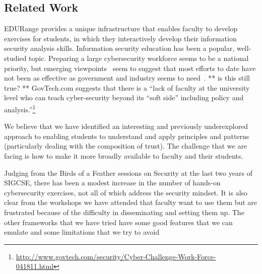 \subsection*{Related Work}
\label{ssec:related}

EDURange provides a unique infrastructure that enables faculty to develop exercises for students, in which they
interactively develop their information security analysis skills.
Information security education has been a popular, well-studied topic.
Preparing a large cybersecurity workforce seems to be a national
priority, but emerging viewpoints~\cite{cooper2009sigcse} seem to
suggest that most efforts to date have not been as effective as
government and industry seems to need~\cite{locasto2011cacm}. ** is this still true? **
GovTech.com suggests that there is a ``lack of faculty at the
university level who can teach cyber-security beyond its ``soft side''
including policy and
analysis.''\footnote{\url{http://www.govtech.com/security/Cyber-Challenge-Work-Force-041811.html}}


We believe that we have identified an interesting and previously
underexplored approach to enabling students to understand and apply
principles and patterns (particularly dealing with the composition of
trust).  The challenge that we are facing is how to make it more broadly available to
faculty and their students.


Judging from the Birds of a Feather sessions on Security at the last two years of SIGCSE, there
has been a modest increase in the number of hands-on cybersecurity exercises, not all of which
address the security mindset.  It is also clear from the workshops we have attended that faculty 
want to use them but are frustrated because of the difficulty in disseminating and setting them up.
The other frameworks that we have tried have some good features that we can emulate and some limitations
that we try to avoid


